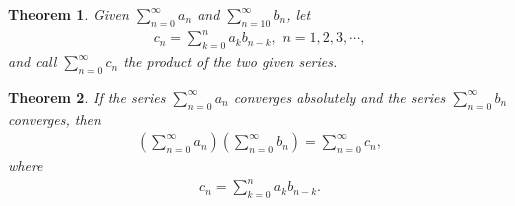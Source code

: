 \documentclass[10pt]{book}
\newtheorem{theorem}{Theorem}[chapter]
\theoremstyle{definition}
\numberwithin{equation}{chapter}
\begin{document}
\medskip

\begin{theorem}
Given $\sum^\infty_{n=0} a_n$ and $\sum^\infty_{n=10} b_n$, let
\begin{align*}
    c_n = \sum^n_{k=0} a_k b_{n-k}, \,\, n = 1,2,3,\cdots,
\end{align*}
and call $\sum^\infty_{n=0} c_n$ the product of the two given series.
\end{theorem}


\begin{theorem}
If the series $\sum^\infty_{n=0} a_n$ converges absolutely and the series $\sum^\infty_{n=0} b_n$ converges, then
\begin{align*}
    \left(\sum^\infty_{n=0} a_n\right) \left(\sum^\infty_{n=0} b_n\right) = \sum^\infty_{n=0} c_n,
\end{align*}
where 
\begin{align*}
    c_n = \sum^n_{k=0} a_k b_{n-k}.
\end{align*}
\end{theorem}
\end{document}

